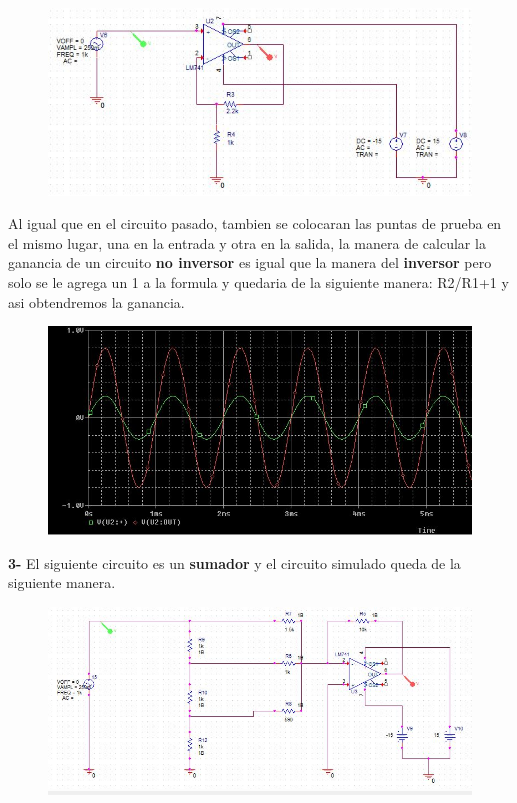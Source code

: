\documentclass[12pt,a4paper]{article}
\begin{document}
\begin{figure}[h!]
\centering
\includegraphics[scale=1]{NoInversor1.png} 
\end{figure}

Al igual que en el circuito pasado, tambien se colocaran las puntas de prueba en el mismo lugar, una en la entrada y otra en la salida, la manera de calcular la ganancia de un circuito \textbf{no inversor} es igual que la manera del \textbf{inversor} pero solo se le agrega un 1 a la formula y quedaria de la siguiente manera: R2/R1+1 y asi obtendremos la ganancia.

\begin{figure}[h!]
\centering
\includegraphics[scale=1]{NoInversor2.png} 
\end{figure}

\textbf{3-} El siguiente circuito es un \textbf{sumador} y el circuito simulado queda de la siguiente manera.

\begin{figure}[h!]
\centering
\includegraphics[scale=1]{Sumador.png} 
\end{figure}
\end{document}
